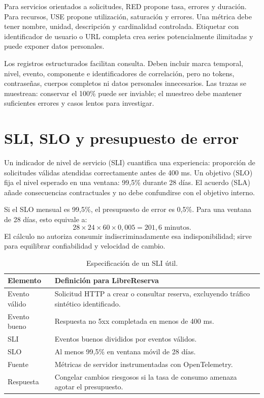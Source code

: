 Para servicios orientados a solicitudes, RED propone tasa, errores y duración. Para recursos, USE propone utilización, saturación y errores. Una métrica debe tener nombre, unidad, descripción y cardinalidad controlada. Etiquetar con identificador de usuario o URL completa crea series potencialmente ilimitadas y puede exponer datos personales.

Los registros estructurados facilitan consulta. Deben incluir marca temporal, nivel, evento, componente e identificadores de correlación, pero no tokens, contraseñas, cuerpos completos ni datos personales innecesarios. Las trazas se muestrean: conservar el 100\% puede ser inviable; el muestreo debe mantener suficientes errores y casos lentos para investigar.

\section{SLI, SLO y presupuesto de error}

Un indicador de nivel de servicio (SLI) cuantifica una experiencia: proporción de solicitudes válidas atendidas correctamente antes de 400 ms. Un objetivo (SLO) fija el nivel esperado en una ventana: 99,5\% durante 28 días. El acuerdo (SLA) añade consecuencias contractuales y no debe confundirse con el objetivo interno.

Si el SLO mensual es 99,5\%, el presupuesto de error es 0,5\%. Para una ventana de 28 días, esto equivale a:
\[
28\times24\times60\times0{,}005=201{,}6\text{ minutos}.
\]
El cálculo no autoriza consumir indiscriminadamente esa indisponibilidad; sirve para equilibrar confiabilidad y velocidad de cambio.

\begin{table}[htbp]
\centering
\caption{Especificación de un SLI útil.}
\begin{tabularx}{\textwidth}{p{3.2cm}X}
\toprule
\textbf{Elemento} & \textbf{Definición para LibreReserva}\\
\midrule
Evento válido & Solicitud HTTP a crear o consultar reserva, excluyendo tráfico sintético identificado.\\
Evento bueno & Respuesta no 5xx completada en menos de 400 ms.\\
SLI & Eventos buenos divididos por eventos válidos.\\
SLO & Al menos 99,5\% en ventana móvil de 28 días.\\
Fuente & Métricas de servidor instrumentadas con OpenTelemetry.\\
Respuesta & Congelar cambios riesgosos si la tasa de consumo amenaza agotar el presupuesto.\\
\bottomrule
\end{tabularx}
\end{table}

